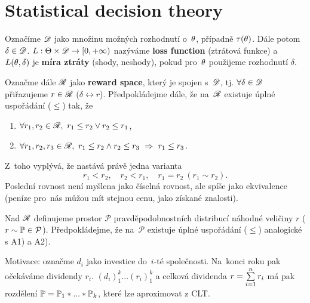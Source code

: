 \section{Statistical decision theory}

\begin{define}
	Označíme $\mathscr{D}$ jako množinu možných rozhodnutí o~$\theta$, případně $\tau(\theta)$. Dále potom $\delta\in\mathscr{D}$. $L:\Theta\times\mathscr{D}\to[0,+\infty)$ nazýváme \textbf{loss function} (ztrátová funkce) a~$L(\theta,\delta)$ je \textbf{míra ztráty} (shody, neshody), pokud pro~$\theta$ použijeme rozhodnutí $\delta$.
	
	Označme dále $\mathscr{R}$ jako \textbf{reward space}, který je spojen s~$\mathscr{D}$, tj. $\forall\delta\in\mathscr{D}$ přiřazujeme $r\in\mathscr{R}$ ($\delta\leftrightarrow r$). Předpokládejme dále, že na~$\mathscr{R}$ existuje úplné uspořádání ($\leq$) tak, že \begin{enumerate}[{A}1)]
		\item $\forall r_1,r_2\in\mathscr{R},~r_1\leq r_2 \vee r_2\leq r_1$,
		\item $\forall r_1,r_2,r_3\in\mathscr{R},~r_1\leq r_2 \wedge r_2\leq r_3~\Rightarrow~r_1\leq r_3$. 
	\end{enumerate}Z~toho vyplývá, že nastává právě jedna varianta
$$ r_1<r_2,\quad r_2<r_1,\quad r_1=r_2~(r_1\sim r_2).$$
Poslední rovnost není myšlena jako číselná rovnost, ale spíše jako ekvivalence (peníze pro~nás můžou mít stejnou cenu, jako získané znalosti).

	Nad $\mathscr{R}$ definujeme prostor $\mathcal{P}$ pravděpodobnostních distribucí náhodné veličiny $r$ ($r\sim\mathbb{P}\in\mathcal{P}$). Předpokládejme, že na~$\mathcal{P}$ existuje úplné uspořádání ($\leq$) analogické s A1) a A2).
\end{define}

Motivace: označme $d_i$ jako investice do~$i$-té společnosti. Na~konci roku pak očekáváme dividendy $r_i$. $(d_i)_1^k...(r_i)_1^k$ a celková dividenda $r=\sum\limits_{i=1}^{n} r_i$ má pak rozdělení $\mathbb{P}=\mathbb{P}_1\ast...\ast\mathbb{P}_k$, které lze aproximovat z CLT.

